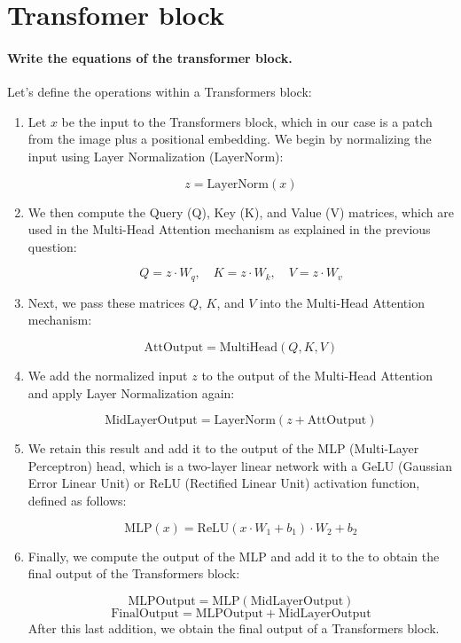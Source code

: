 \section{Transfomer block}

\paragraph{Write the equations of the transformer block.}
Let's define the operations within a Transformers block:

\begin{enumerate}
    \item Let \( x \) be the input to the Transformers block, which in our case is a patch from the image plus a positional embedding. We begin by normalizing the input using Layer Normalization (LayerNorm):
    
    \[
        z = \text{LayerNorm}(x)
        \]
        
        \item We then compute the Query (Q), Key (K), and Value (V) matrices, which are used in the Multi-Head Attention mechanism as explained in the previous question:
        
\[
    Q = z \cdot W_q, \quad K = z \cdot W_k, \quad V = z \cdot W_v
    \]
    
\item Next, we pass these matrices \( Q \), \( K \), and \( V \) into the Multi-Head Attention mechanism:

\[
\text{AttOutput} = \text{MultiHead}(Q, K, V)
\]

\item We add the normalized input \( z \) to the output of the Multi-Head Attention and apply Layer Normalization again:

\[
\text{MidLayerOutput} = \text{LayerNorm}(z + \text{AttOutput})
\]

\item We retain this result and add it to the output of the MLP (Multi-Layer Perceptron) head, which is a two-layer linear network with a GeLU (Gaussian Error Linear Unit) or ReLU (Rectified Linear Unit) activation function, defined as follows:

\[
\text{MLP}(x) = \text{ReLU}(x \cdot W_1 + b_1) \cdot W_2 + b_2
\]

\item Finally, we compute the output of the MLP and add it to the  to obtain the final output of the Transformers block:

\[
    \text{MLPOutput} = \text{MLP}(\text{MidLayerOutput})
\]
\[
    \text{FinalOutput} = \text{MLPOutput} + \text{MidLayerOutput}
\]
After this last addition, we obtain the final output of a Transformers block.
\end{enumerate}

